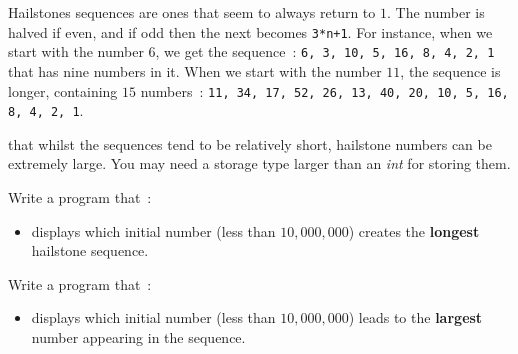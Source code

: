 
Hailstones sequences are ones that seem to
always return to $1$. The number is halved if even, and if
odd then the next becomes \verb^3*n+1^. For instance, when we start
with the number $6$, we get the sequence~:
\verb^6, 3, 10, 5, 16, 8, 4, 2, 1^
that has nine numbers in it. When we start with
the number $11$, the sequence is longer, containing $15$
numbers~:
\verb^11, 34, 17, 52, 26, 13, 40, 20, 10, 5, 16, 8, 4, 2, 1^.

 that whilst the sequences tend to be relatively short, hailstone numbers can be extremely large.
You may need a storage type larger than an {\em int} for storing them.

\begin{exercise}
Write a program that~:
\begin{itemize}
\item displays which initial number (less than
$10,000,000$) creates the {\bf longest} hailstone sequence.
\end{itemize}
\end{exercise}

\begin{exercise}
Write a program that~:
\begin{itemize}
\item displays which initial number (less than
$10,000,000$) leads to the {\bf largest} number appearing in the sequence.
\end{itemize}
\end{exercise}
